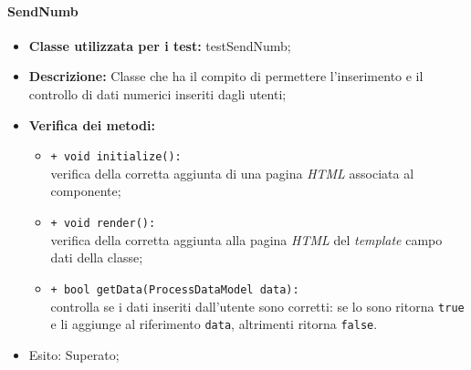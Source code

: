 \paragraph{SendNumb}
\begin{flushleft}
\begin{itemize}
\item \textbf{Classe utilizzata per i test:} testSendNumb;
\item \textbf{Descrizione:} Classe che ha il compito di permettere l'inserimento e il controllo di dati numerici inseriti dagli utenti;
\item \textbf{Verifica dei metodi:}
\begin{sloppypar}
\begin{itemize}
\item \texttt{+ void initialize():}\\ verifica della corretta aggiunta di una pagina \textit{HTML} associata al componente;
\item \texttt{+ void render():}\\ verifica della corretta aggiunta alla pagina \textit{HTML} del \textit{template} campo dati della classe;
\item \texttt{+ bool getData(ProcessDataModel data):}\\ controlla se i dati inseriti dall'utente sono corretti: se lo sono ritorna \texttt{true} e li aggiunge al riferimento \texttt{data}, altrimenti ritorna \texttt{false}.
\end{itemize}
\end{sloppypar}
\item Esito: Superato;
\end{itemize}
\end{flushleft}

